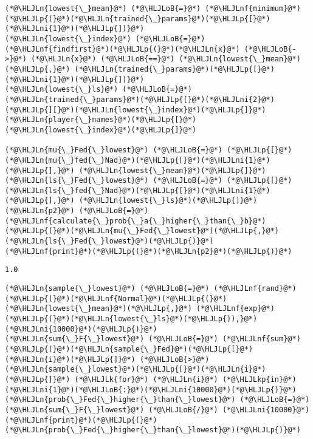 \documentclass[12pt,a4paper]{article}
\newcommand{\HLJLk}[1]{\textcolor[RGB]{148,91,176}{\textbf{#1}}}
\newcommand{\HLJLkp}[1]{\textcolor[RGB]{148,91,176}{\textbf{#1}}}
\newcommand{\HLJLn}[1]{#1}
\newcommand{\HLJLnf}[1]{\textcolor[RGB]{66,102,213}{#1}}
\newcommand{\HLJLni}[1]{\textcolor[RGB]{59,151,46}{#1}}
\newcommand{\HLJLoB}[1]{\textcolor[RGB]{102,102,102}{\textbf{#1}}}
\newcommand{\HLJLp}[1]{#1}
\begin{document}
\begin{lstlisting}
(*@\HLJLn{lowest{\_}mean}@*) (*@\HLJLoB{=}@*) (*@\HLJLnf{minimum}@*)(*@\HLJLp{(}@*)(*@\HLJLn{trained{\_}params}@*)(*@\HLJLp{[}@*)(*@\HLJLni{1}@*)(*@\HLJLp{])}@*)
(*@\HLJLn{lowest{\_}index}@*) (*@\HLJLoB{=}@*) (*@\HLJLnf{findfirst}@*)(*@\HLJLp{(}@*)(*@\HLJLn{x}@*) (*@\HLJLoB{->}@*) (*@\HLJLn{x}@*) (*@\HLJLoB{==}@*) (*@\HLJLn{lowest{\_}mean}@*)(*@\HLJLp{,}@*) (*@\HLJLn{trained{\_}params}@*)(*@\HLJLp{[}@*)(*@\HLJLni{1}@*)(*@\HLJLp{])}@*)
(*@\HLJLn{lowest{\_}ls}@*) (*@\HLJLoB{=}@*) (*@\HLJLn{trained{\_}params}@*)(*@\HLJLp{[}@*)(*@\HLJLni{2}@*)(*@\HLJLp{][}@*)(*@\HLJLn{lowest{\_}index}@*)(*@\HLJLp{]}@*)
(*@\HLJLn{player{\_}names}@*)(*@\HLJLp{[}@*)(*@\HLJLn{lowest{\_}index}@*)(*@\HLJLp{]}@*)

(*@\HLJLn{mu{\_}Fed{\_}lowest}@*) (*@\HLJLoB{=}@*) (*@\HLJLp{[}@*)(*@\HLJLn{mu{\_}fed{\_}Nad}@*)(*@\HLJLp{[}@*)(*@\HLJLni{1}@*)(*@\HLJLp{],}@*) (*@\HLJLn{lowest{\_}mean}@*)(*@\HLJLp{]}@*)
(*@\HLJLn{ls{\_}Fed{\_}lowest}@*) (*@\HLJLoB{=}@*) (*@\HLJLp{[}@*)(*@\HLJLn{ls{\_}fed{\_}Nad}@*)(*@\HLJLp{[}@*)(*@\HLJLni{1}@*)(*@\HLJLp{],}@*) (*@\HLJLn{lowest{\_}ls}@*)(*@\HLJLp{]}@*)
(*@\HLJLn{p2}@*) (*@\HLJLoB{=}@*) (*@\HLJLnf{calculate{\_}prob{\_}a{\_}higher{\_}than{\_}b}@*)(*@\HLJLp{(}@*)(*@\HLJLn{mu{\_}Fed{\_}lowest}@*)(*@\HLJLp{,}@*) (*@\HLJLn{ls{\_}Fed{\_}lowest}@*)(*@\HLJLp{)}@*)
(*@\HLJLnf{print}@*)(*@\HLJLp{(}@*)(*@\HLJLn{p2}@*)(*@\HLJLp{)}@*)
\end{lstlisting}

\begin{lstlisting}
1.0
\end{lstlisting}


\begin{lstlisting}
(*@\HLJLn{sample{\_}lowest}@*) (*@\HLJLoB{=}@*) (*@\HLJLnf{rand}@*)(*@\HLJLp{(}@*)(*@\HLJLnf{Normal}@*)(*@\HLJLp{(}@*)(*@\HLJLn{lowest{\_}mean}@*)(*@\HLJLp{,}@*) (*@\HLJLnf{exp}@*)(*@\HLJLp{(}@*)(*@\HLJLn{lowest{\_}ls}@*)(*@\HLJLp{)),}@*) (*@\HLJLni{10000}@*)(*@\HLJLp{)}@*)
(*@\HLJLn{sum{\_}F{\_}lowest}@*) (*@\HLJLoB{=}@*) (*@\HLJLnf{sum}@*)(*@\HLJLp{(}@*)(*@\HLJLn{sample{\_}Fed}@*)(*@\HLJLp{[}@*)(*@\HLJLn{i}@*)(*@\HLJLp{]}@*) (*@\HLJLoB{>}@*) (*@\HLJLn{sample{\_}lowest}@*)(*@\HLJLp{[}@*)(*@\HLJLn{i}@*)(*@\HLJLp{]}@*) (*@\HLJLk{for}@*) (*@\HLJLn{i}@*) (*@\HLJLkp{in}@*) (*@\HLJLni{1}@*)(*@\HLJLoB{:}@*)(*@\HLJLni{10000}@*)(*@\HLJLp{)}@*)
(*@\HLJLn{prob{\_}Fed{\_}higher{\_}than{\_}lowest}@*) (*@\HLJLoB{=}@*) (*@\HLJLn{sum{\_}F{\_}lowest}@*) (*@\HLJLoB{/}@*) (*@\HLJLni{10000}@*)
(*@\HLJLnf{print}@*)(*@\HLJLp{(}@*)(*@\HLJLn{prob{\_}Fed{\_}higher{\_}than{\_}lowest}@*)(*@\HLJLp{)}@*)
\end{lstlisting}
\end{document}
